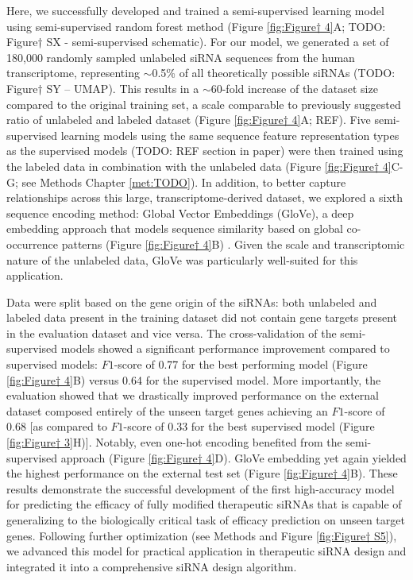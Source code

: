\documentclass{report}
\begin{document}
Here, we successfully developed and trained a semi-supervised learning model using semi-supervised random forest method (Figure \ref{fig:Figure† 4}A; TODO: Figure† SX - semi-supervised schematic). For our model, we generated a set of 180,000 randomly sampled unlabeled siRNA sequences from the human transcriptome, representing $\sim$0.5\% of all theoretically possible siRNAs (TODO: Figure† SY – UMAP). This results in a $\sim$60-fold increase of the dataset size compared to the original training set, a scale comparable to previously suggested ratio of unlabeled and labeled dataset (Figure \ref{fig:Figure† 4}A; REF). Five semi-supervised learning models using the same sequence feature representation types as the supervised models (TODO: REF section in paper) were then trained using the labeled data in combination with the unlabeled data (Figure \ref{fig:Figure† 4}C-G; see Methods Chapter \ref{met:TODO}). In addition, to better capture relationships across this large, transcriptome-derived dataset, we explored a sixth sequence encoding method: Global Vector Embeddings (GloVe), a deep embedding approach that models sequence similarity based on global co-occurrence patterns (Figure \ref{fig:Figure† 4}B) \cite{pennington_glove_2014}. Given the scale and transcriptomic nature of the unlabeled data, GloVe was particularly well-suited for this application. 

Data were split based on the gene origin of the siRNAs: both unlabeled and labeled data present in the training dataset did not contain gene targets present in the evaluation dataset and vice versa. The cross-validation of the semi-supervised models showed a significant performance improvement compared to supervised models: $F1$-score of 0.77 for the best performing model (Figure \ref{fig:Figure† 4}B) versus 0.64 for the supervised model. More importantly, the evaluation showed that we drastically improved performance on the external dataset composed entirely of the unseen target genes achieving an $F1$-score of 0.68 [as compared to $F1$-score of 0.33 for the best supervised model (Figure \ref{fig:Figure† 3}H)]. Notably, even one-hot encoding benefited from the semi-supervised approach (Figure \ref{fig:Figure† 4}D). GloVe embedding yet again yielded the highest performance on the external test set (Figure \ref{fig:Figure† 4}B). 
These results demonstrate the successful development of the first high-accuracy model for predicting the efficacy of fully modified therapeutic siRNAs that is capable of generalizing to the biologically critical task of efficacy prediction on unseen target genes. Following further optimization (see Methods and Figure \ref{fig:Figure† S5}), we advanced this model for practical application in therapeutic siRNA design and integrated it into a comprehensive siRNA design algorithm.
\end{document}
